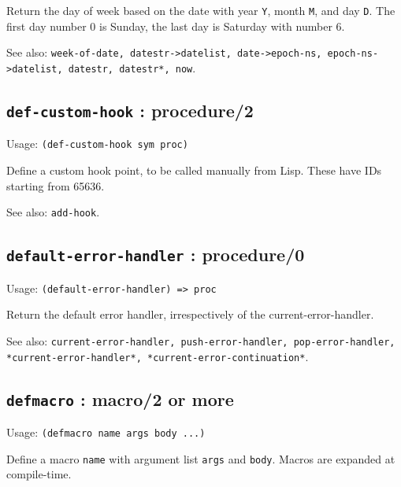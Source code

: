 \documentclass[
]{article}
\newcommand{\passthrough}[1]{#1}
\begin{document}
Return the day of week based on the date with year
\passthrough{\lstinline!Y!}, month \passthrough{\lstinline!M!}, and day
\passthrough{\lstinline!D!}. The first day number 0 is Sunday, the last
day is Saturday with number 6.

See also:
\passthrough{\lstinline!week-of-date, datestr->datelist, date->epoch-ns, epoch-ns->datelist, datestr, datestr*, now!}.

\hypertarget{def-custom-hook-procedure2-1}{%
\subsection{\texorpdfstring{\texttt{def-custom-hook} :
procedure/2}{def-custom-hook : procedure/2}}\label{def-custom-hook-procedure2-1}}

Usage: \passthrough{\lstinline!(def-custom-hook sym proc)!}

Define a custom hook point, to be called manually from Lisp. These have
IDs starting from 65636.

See also: \passthrough{\lstinline!add-hook!}.

\hypertarget{default-error-handler-procedure0-1}{%
\subsection{\texorpdfstring{\texttt{default-error-handler} :
procedure/0}{default-error-handler : procedure/0}}\label{default-error-handler-procedure0-1}}

Usage: \passthrough{\lstinline!(default-error-handler) => proc!}

Return the default error handler, irrespectively of the
current-error-handler.

See also:
\passthrough{\lstinline!current-error-handler, push-error-handler, pop-error-handler, *current-error-handler*, *current-error-continuation*!}.

\hypertarget{defmacro-macro2-or-more-1}{%
\subsection{\texorpdfstring{\texttt{defmacro} : macro/2 or
more}{defmacro : macro/2 or more}}\label{defmacro-macro2-or-more-1}}

Usage: \passthrough{\lstinline!(defmacro name args body ...)!}

Define a macro \passthrough{\lstinline!name!} with argument list
\passthrough{\lstinline!args!} and \passthrough{\lstinline!body!}.
Macros are expanded at compile-time.
\end{document}

